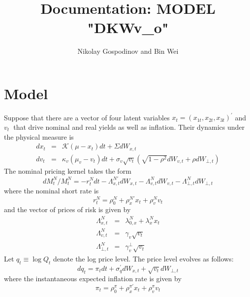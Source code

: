 \documentclass{article}
\begin{document}
\title{Documentation: MODEL "DKWv\_o"}
\author{Nikolay Gospodinov and Bin Wei}
\maketitle

\section{Model}

Suppose that there are a vector of four latent variables $x_{t}=\left(
x_{1t},x_{2t},x_{3t}\right) ^{\prime }$ and $v_{t}$\textbf{\ }that drive
nominal and real yields as well as inflation. Their dynamics under the
physical measure is%
\begin{eqnarray}
dx_{t} &=&\mathcal{K}\left( \mu -x_{t}\right) dt+\Sigma dW_{x,t} \\
dv_{t} &=&\kappa _{v}\left( \mu _{v}-v_{t}\right) dt+\sigma _{v}\sqrt{v_{t}}%
\left( \sqrt{1-\rho ^{2}}dW_{v,t}+\rho dW_{\bot ,t}\right) 
\end{eqnarray}%
The nominal pricing kernel takes the form%
\begin{equation}
dM_{t}^{N}/M_{t}^{N}=-r_{t}^{N}dt-\Lambda _{x,t}^{N\prime }dW_{x,t}-\Lambda
_{v,t}^{N}dW_{v,t}-\Lambda _{\bot ,t}^{N}dW_{\bot ,t}
\end{equation}%
where the nominal short rate is%
\begin{equation}
r_{t}^{N}=\rho _{0}^{N}+\rho _{x}^{N\prime }x_{t}+\rho _{v}^{N}v_{t}
\end{equation}%
and the vector of prices of risk is given by\qquad 
\begin{eqnarray*}
\Lambda _{x,t}^{N} &=&\lambda _{0,x}^{N}+\lambda _{x}^{N}x_{t} \\
\Lambda _{v,t}^{N} &=&\gamma _{v}\sqrt{v_{t}} \\
\Lambda _{\bot ,t}^{N} &=&\gamma _{v}^{\bot }\sqrt{v_{t}}
\end{eqnarray*}%
Let $q_{t}\equiv \log Q_{t}$ denote the log price level. The price level
evolves as follows: 
\begin{equation}
dq_{t}=\pi _{t}dt+\sigma _{q}^{\prime }dW_{x,t}+\sqrt{v_{t}}dW_{\bot ,t}
\end{equation}%
where the instantaneous expected inflation rate is given by 
\begin{equation}
\pi _{t}=\rho _{0}^{\pi }+\rho _{x}^{\pi \prime }x_{t}+\rho _{v}^{\pi }v_{t}
\end{equation}
\end{document}
